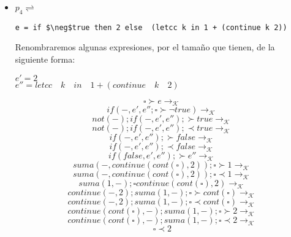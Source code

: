 \documentclass[11pt, a4paper]{report}
\begin{document}
\begin{itemize}
\item $p_{4} \rightleftharpoons$ 
 \begin{lstlisting}[mathescape=true]
      e = if $\neg$true then 2 else  (letcc k in 1 + (continue k 2)) 
		\end{lstlisting}
		
Renombraremos algunas expresiones, por el tamaño que  tienen, de la siguiente forma:

$e' = 2$\\
$e'' = letcc \quad k \quad in \quad 1 + (continue \quad k \quad 2)$
		
$$\square \succ  e \rightarrow_{\mathcal{K}}$$
$$ if(-,e',e''; \square \succ \neg true) \rightarrow_{\mathcal{K}}$$
$$not(-);if(-,e',e''); \succ true \rightarrow_{\mathcal{K}}$$
$$not(-);if(-,e',e''); \prec true \rightarrow_{\mathcal{K}}$$
$$if(-,e',e''); \succ false \rightarrow_{\mathcal{K}}$$
$$if(-,e',e''); \prec false \rightarrow_{\mathcal{K}}$$
$$if(false,e',e''); \succ e'' \rightarrow_{\mathcal{K}}$$
$$suma(-,continue(cont(\square),2)); \square \succ 1 \rightarrow_{\mathcal{K}}$$
$$suma(-,continue(cont(\square),2)); \square \prec 1 \rightarrow_{\mathcal{K}}$$
$$suma(1,-);\square continue(cont(\square),2) \rightarrow_{\mathcal{K}}$$
$$continue(-,2); suma(1,-); \square \succ cont(\square) \rightarrow_{\mathcal{K}}$$
$$continue(-,2); suma(1,-); \square \prec cont(\square) \rightarrow_{\mathcal{K}}$$
$$continue(cont(\square),-); suma(1,-); \square \succ 2 \rightarrow_{\mathcal{K}}$$
$$continue(cont(\square),-); suma(1,-); \square \prec 2 \rightarrow_{\mathcal{K}}$$
$$\square \prec 2$$

\end{itemize}	
\end{document}
